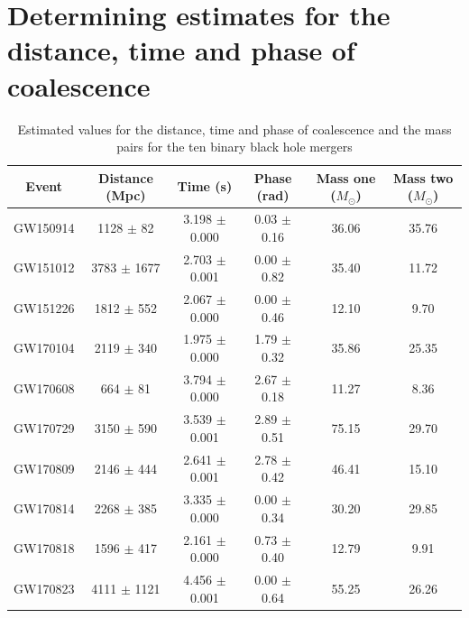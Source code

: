 \documentclass[]{article}
\begin{document}
\section*{Determining estimates for the distance, time and phase of coalescence}

\begin{table}[t]
    \begin{center}
        \begin{tabular}{|c c c c c c|}
            \hline
            Event & Distance (Mpc) & Time (s) & Phase (rad) & Mass one ($M_{\odot}$) & Mass two ($M_{\odot}$)\\
            \hline
            GW150914 & 1128 $\pm$ 82 & 3.198 $\pm$ 0.000 & 0.03 $\pm$ 0.16 & 36.06 & 35.76 \\
            GW151012 & 3783 $\pm$ 1677 & 2.703 $\pm$ 0.001 & 0.00 $\pm$ 0.82 & 35.40 & 11.72 \\
            GW151226 & 1812 $\pm$ 552 & 2.067 $\pm$ 0.000 & 0.00 $\pm$ 0.46 & 12.10 & 9.70 \\
            GW170104 & 2119 $\pm$ 340 & 1.975 $\pm$ 0.000 & 1.79 $\pm$ 0.32 & 35.86 & 25.35 \\
            GW170608 & 664 $\pm$ 81 & 3.794 $\pm$ 0.000 & 2.67 $\pm$ 0.18 & 11.27 & 8.36 \\
            GW170729 & 3150 $\pm$ 590 & 3.539 $\pm$ 0.001 & 2.89 $\pm$ 0.51 & 75.15 & 29.70 \\
            GW170809 & 2146 $\pm$ 444 & 2.641 $\pm$ 0.001 & 2.78 $\pm$ 0.42 & 46.41 & 15.10 \\
            GW170814 & 2268 $\pm$ 385 & 3.335 $\pm$ 0.000 & 0.00 $\pm$ 0.34 & 30.20 & 29.85 \\
            GW170818 & 1596 $\pm$ 417 & 2.161 $\pm$ 0.000 & 0.73 $\pm$ 0.40 & 12.79 & 9.91 \\
            GW170823 & 4111 $\pm$ 1121 & 4.456 $\pm$ 0.001 & 0.00 $\pm$ 0.64 & 55.25 & 26.26 \\
            \hline
        \end{tabular}
        \caption{Estimated values for the distance, time and phase of coalescence and the mass pairs for the ten binary black hole mergers}
        \label{tab:estimates}
    \end{center}
\end{table}
\end{document}
